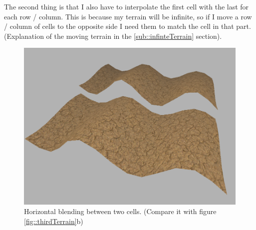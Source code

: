 \newpage

\begin{figure}[hbt!]
	\centering
	\qquad
	\caption{}
\end{figure}

\noindent
The second thing is that I also have to interpolate the first cell with the last for each row / column. This is because my terrain will be infinite, so if I move a row / column of cells to the opposite side I need them to match the cell in that part. (Explanation of the moving terrain in the \ref{sub::infinteTerrain} section).

\begin{figure}[hbt!]
	\centering
	\includegraphics[width= 0.75
	\textwidth]{images/terrain7.png}
	\caption{Horizontal blending between two cells. (Compare it with figure \ref{fig::thirdTerrain}b)}
\end{figure} 

